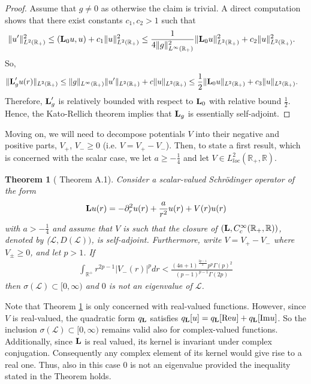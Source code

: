 \documentclass[11pt,reqno]{amsart}
\newtheorem{theorem}{Theorem}[section]
\theoremstyle{remark}
\newcommand{\R}{\mathbb{R}}
\newcommand{\Lf}{\textup{\textbf{L}}}
\renewcommand{\Re}{\textup{Re}}
\renewcommand{\Im}{\textup{Im}}
\theoremstyle{definition}
\begin{document}
\begin{proof}
  Assume that $g\neq 0$ as otherwise the claim is trivial.  A direct computation shows that there exist constants $c_1,c_2>1$ such that 
    \begin{align*}
    \|u'\|^2_{L^2(\R_+)}&\leq (\Lf_0 u,u)+c_1\|u\|_{L^2(\R_+)}^2\leq \frac1{4\|g\|_{L^\infty(\R_+)}^2}  \|\Lf_0 u\|^2_{L^2(\R_+)}+ c_2 \|u\|^2_{L^2(\R_+)}.
    \end{align*}
    So, 
    \begin{align*}
  \|\Lf_g' u(r)\|_{L^2(\R_+)} &\leq \|g\|_{L^\infty(\R_+)}\|u'\|_{L^2(\R_+)}+ c \|u\|_{L^2(\R_+)}\leq \frac1{2}  \|\Lf_0 u\|_{L^2(\R_+)}+ c_3 \|u\|_{L^2(\R_+)}.
    \end{align*}
    Therefore, $\Lf_g'$ is relatively bounded with respect to $\Lf_0$ with relative bound $\frac12$. Hence, the Kato-Rellich theorem implies that $\Lf_g$ is essentially self-adjoint.
\end{proof}
Moving on, we will need to decompose potentials $V$ into their negative and positive parts, $V_+$, $V_-\geq 0$ (i.e. $V=V_+-V_-$). Then, to state a first result, which is concerned with the scalar case, we let $a\geq-\frac{1}{4}$ and let $V\in L^2_{loc}(\R_+,\R)$.
\begin{theorem}[\cite{GloSch20} Theorem A.1] \label{lem: scalar GGMT}
Consider a scalar-valued Schrödinger operator of the form 
\begin{align}
    \Lf u(r)= -\partial_r^2u(r)+\frac{a }{r^2} u(r)+V(r)u(r)
\end{align}
with $a>-\frac
14$ and assume that $V$ is such that the closure of $(\Lf,C^\infty_c(\R_+,\R))$, denoted by ($\mathcal{L},D(\mathcal{L}))$, is self-adjoint. Furthermore, write $V=V_+ -V_-$ where $V_{\pm }\geq 0$, and let $p> 1$. If
\begin{align*}
    \int_{\R^+}r^{2p-1}|V_-(r)|^pdr < \frac{(4 a+1)^{\frac{2p-1}{2}} p^p\Gamma(p)^2}{(p-1)^{p-1}\Gamma(2p)} 
\end{align*}
then $\sigma(\mathcal{L})\subset[0,\infty)$ and $0$ is not an eigenvalue of $\mathcal{L}$.
\end{theorem} 
Note that Theorem \ref{lem: scalar GGMT}  is only concerned with real-valued functions. However, since $V$ is real-valued, the quadratic form  $q_\Lf$ satisfies
$q_\Lf[u]=q_\Lf[\Re u]+q_\Lf[\Im u]$. 
So the inclusion $\sigma(\mathcal{L})\subset[0,\infty)$ remains valid also for complex-valued functions. Additionally, since $\Lf$ is real valued, its kernel is invariant under complex conjugation. Consequently any complex element of its kernel would give rise to a real one. Thus, also in this case $0$ is not an eigenvalue provided the inequality stated in the Theorem holds.
\end{document}
